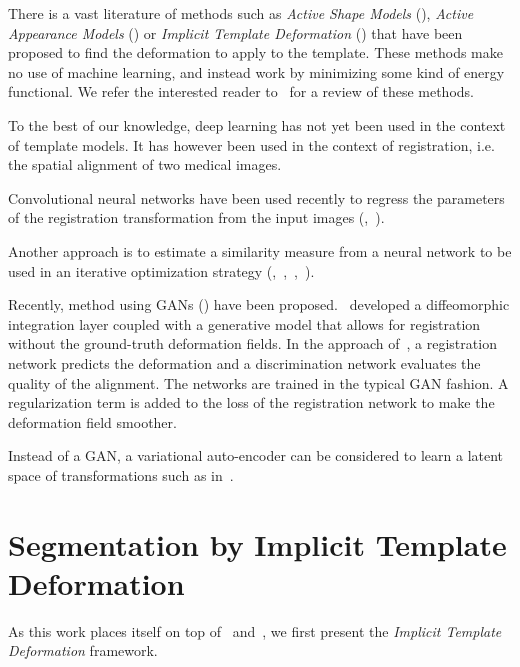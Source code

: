 There is a vast literature of methods such as \textit{Active Shape Models} (\textcite{cootes1995}), \textit{Active Appearance Models} (\textcite{cootes1998ECCV}) or \textit{Implicit Template Deformation} (\textcite{saddi2007}) that have been proposed to find the deformation to apply to the template. These methods make no use of machine learning, and instead work by minimizing some kind of energy functional. 
We refer the interested reader to~\textcite{heimann2009} for a review of these methods.

To the best of our knowledge, deep learning has not yet been used in the context of template models. It has however been used in the context of registration, i.e. the spatial alignment of two medical images.

Convolutional neural networks have been used recently to regress the parameters of the registration transformation from the input images (\textcite{miao2016},~\textcite{yang2016}).

Another approach is to estimate a similarity measure from a neural network to be used in an iterative optimization strategy (\textcite{wu2013MICCAI},~\textcite{cheng2015},~\textcite{simonovosky2016MICCAI},~\textcite{Vos2019}).

Recently, method using GANs (\textcite{goodfellow2014}) have been proposed.~\textcite{dalca2018MICCAI} developed a diffeomorphic integration layer coupled with a generative model that allows for registration without the ground-truth deformation fields. In the approach of~\textcite{fan2018MICCAI}, a registration network predicts the deformation and a discrimination network evaluates the quality of the alignment. The networks are trained in the typical GAN fashion. A regularization term is added to the loss of the registration network to make the deformation field smoother.

Instead of a GAN, a variational auto-encoder can be considered to learn a latent space of transformations such as in~\textcite{krebs2018}.

\section{Segmentation by Implicit Template Deformation}
\label{sec:implicit}

As this work places itself on top of~\textcite{mory2012MICCAI} and~\textcite{prevost2013PHD}, we first present the \textit{Implicit Template Deformation} framework. 

